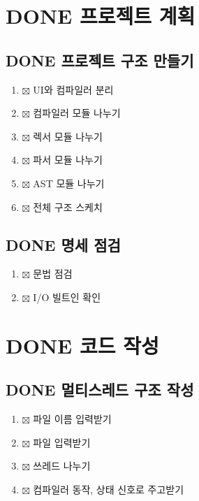 \documentclass[11pt]{article}
\date{\today}
\title{}
\begin{document}
\tableofcontents

\section{{\bfseries\sffamily DONE} 프로젝트 계획}
\label{sec:org308dedb}

\subsection{{\bfseries\sffamily DONE} 프로젝트 구조 만들기}
\label{sec:org1a05a0e}

\begin{enumerate}
\item{$\boxtimes$} UI와 컴파일러 분리
\item{$\boxtimes$} 컴파일러 모듈 나누기
\item{$\boxtimes$} 렉서 모듈 나누기
\item{$\boxtimes$} 파서 모듈 나누기
\item{$\boxtimes$} AST 모듈 나누기
\item{$\boxtimes$} 전체 구조 스케치
\end{enumerate}
\subsection{{\bfseries\sffamily DONE} 명세 점검}
\label{sec:org6f78160}

\begin{enumerate}
\item{$\boxtimes$} 문법 점검
\item{$\boxtimes$} I/O 빌트인 확인
\end{enumerate}
\section{{\bfseries\sffamily DONE} 코드 작성}
\label{sec:orge0a400a}

\subsection{{\bfseries\sffamily DONE} 멀티스레드 구조 작성}
\label{sec:org96311e1}

\begin{enumerate}
\item{$\boxtimes$} 파일 이름 입력받기
\item{$\boxtimes$} 파일 입력받기
\item{$\boxtimes$} 쓰레드 나누기
\item{$\boxtimes$} 컴파일러 동작, 상태 신호로 주고받기
\end{enumerate}
\end{document}
